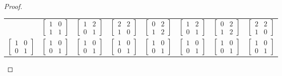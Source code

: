 \documentclass[12pt, psamsfonts]{amsart}
\theoremstyle{definition}
\theoremstyle{remark}
\numberwithin{equation}{section}
\begin{document}
\begin{proof}
\begin{enumerate}
\begin{center}
\begin{tabular}{|c|c|c|c|c|c|c|c|}
          & $\begin{bmatrix} 1 & 0 \\ 1 & 1 \end{bmatrix}$
          & $\begin{bmatrix} 1 & 2 \\ 0 & 1 \end{bmatrix}$
          & $\begin{bmatrix} 2 & 2 \\ 1 & 0 \end{bmatrix}$
          & $\begin{bmatrix} 0 & 2 \\ 1 & 2 \end{bmatrix}$
          & $\begin{bmatrix} 1 & 2 \\ 0 & 1 \end{bmatrix}$
          & $\begin{bmatrix} 0 & 2 \\ 1 & 2 \end{bmatrix}$
          & $\begin{bmatrix} 2 & 2 \\ 1 & 0 \end{bmatrix}$ \\
          $\begin{bmatrix} 1 & 0 \\ 0 & 1 \end{bmatrix}$
          & $\begin{bmatrix} 1 & 0 \\ 0 & 1 \end{bmatrix}$
          & $\begin{bmatrix} 1 & 0 \\ 0 & 1 \end{bmatrix}$
          & $\begin{bmatrix} 1 & 0 \\ 0 & 1 \end{bmatrix}$
          & $\begin{bmatrix} 1 & 0 \\ 0 & 1 \end{bmatrix}$
          & $\begin{bmatrix} 1 & 0 \\ 0 & 1 \end{bmatrix}$
          & $\begin{bmatrix} 1 & 0 \\ 0 & 1 \end{bmatrix}$
          & $\begin{bmatrix} 1 & 0 \\ 0 & 1 \end{bmatrix}$ \\

\end{tabular}
\end{center}
\end{enumerate}
\end{proof}
\end{document}
